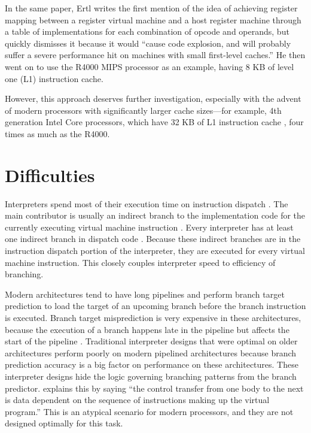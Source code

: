 		In the same paper, Ertl writes the first mention of the idea of achieving register mapping between a register virtual machine and a host register machine through a table of implementations for each combination of opcode and operands, but quickly dismisses it because it would ``cause code explosion, and will probably suffer a severe performance hit on machines with small first-level caches.'' He then went on to use the R4000 MIPS processor as an example, having 8 KB of level one (L1) instruction cache.
	
		However, this approach deserves further investigation, especially with the advent of modern processors with significantly larger cache sizes---for example, 4th generation Intel Core processors, which have 32 KB of L1 instruction cache \citep{haswellarch}, four times as much as the R4000.
	
		
	\section{Difficulties}
		Interpreters spend most of their execution time on instruction dispatch \citep{modernarchvm}. The main contributor is usually an indirect branch to the implementation code for the currently executing virtual machine instruction \citep{optimizingindirectbranch}. Every interpreter has at least one indirect branch in dispatch code \citep{modernarchvm}. Because these indirect branches are in the instruction dispatch portion of the interpreter, they are executed for every virtual machine instruction. This closely couples interpreter speed to efficiency of branching.
		
		Modern architectures tend to have long pipelines and perform branch target prediction to load the target of an upcoming branch before the branch instruction is executed. Branch target misprediction is very expensive in these architectures, because the execution of a branch happens late in the pipeline but affects the start of the pipeline \citep{optimizingindirectbranch}. Traditional interpreter designs that were optimal on older architectures perform poorly on modern pipelined architectures because branch prediction accuracy is a big factor on performance on these architectures. These interpreter designs hide the logic governing branching patterns from the branch predictor. \cite{yeti} explains this by saying ``the control transfer from one body to the next is data dependent on the sequence of instructions making up the virtual program.'' This is an atypical scenario for modern processors, and they are not designed optimally for this task.
		
